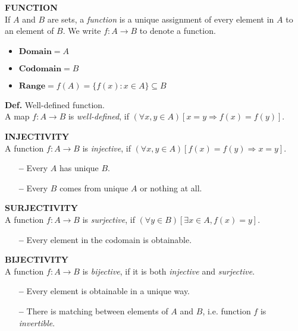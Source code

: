 \documentclass{article}
\newenvironment{impdef}[1]
    { \begin{mdframed}[backgroundcolor=green!10] \textbf{#1} \vspace{0.15cm}\\}
    {  \end{mdframed}}
\newenvironment{regdef}[2][Def.]
    { \begin{mdframed}[backgroundcolor=yellow!10] \textbf{#1} {#2}. \vspace{0.05cm}\\}
    {  \end{mdframed}}
\begin{document}
    
    \begin{impdef}{FUNCTION}
        If $A$ and $B$ are sets, a \textit{function} is a unique assignment of every element in $A$ to an element of $B$. We write $f: A \to B$ to denote a function.
        \begin{itemize}
            \item $\textbf{Domain} = A$
            \item $\textbf{Codomain} = B$
            \item $\textbf{Range} = f(A) = \{f(x): x \in A\} \subseteq B$
        \end{itemize}
    \end{impdef}
        
    \begin{regdef}{Well-defined function}
        A map $f: A \to B$ is \textit{well-defined}, if $(\forall x, y \in A)[x=y \Rightarrow f(x)=f(y)]$.
    \end{regdef}
    
    \begin{impdef}{INJECTIVITY}
        A function $f: A \to B$ is \textit{injective}, if $(\forall x, y \in A)[f(x)=f(y) \Rightarrow x=y]$.
        \begin{itemize}
            \item[\textbf{--}] Every $A$ has unique $B$.
            \item[\textbf{--}] Every $B$ comes from unique $A$ or nothing at all.
        \end{itemize}
    \end{impdef}
    
    \begin{impdef}{SURJECTIVITY}
        A function $f: A \to B$ is \textit{surjective}, if $(\forall y \in B)[\exists x \in A, f(x) = y]$.
        \begin{itemize}
            \item[\textbf{--}] Every element in the codomain is obtainable.
        \end{itemize}
    \end{impdef}
    
    \begin{impdef}{BIJECTIVITY}
        A function $f: A \to B$ is \textit{bijective}, if it is both \textit{injective} and \textit{surjective}.
        \begin{itemize}
            \item[\textbf{--}] Every element is obtainable in a unique way.
            \item[\textbf{--}] There is matching between elements of $A$ and $B$, i.e. function $f$ is \textit{invertible}. 
        \end{itemize}
    \end{impdef}
    
\end{document}
